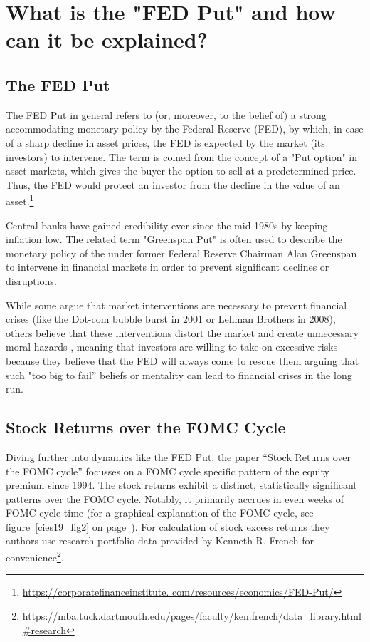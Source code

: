 \chapter{What is the "FED Put" and how can it be explained?}
\section{The FED Put}
The FED Put in general refers to (or, moreover, to the belief of) a strong accommodating monetary policy by the Federal Reserve (FED), by which, in case of a sharp decline in asset prices, the FED is expected by the market (its investors) to intervene. The term is coined from the concept of a "Put option" in asset markets, which gives the buyer the option to sell at a predetermined price. Thus, the FED would protect an investor from the decline in the value of an asset.\footnote{\url{https://corporatefinanceinstitute. com/resources/economics/FED-Put/}}

Central banks have gained credibility ever since the mid-1980s by keeping inflation low. \parencite{hall_is_2011} The related term "Greenspan Put" is often used to describe the monetary policy of the under former Federal Reserve Chairman Alan Greenspan to intervene in financial markets in order to prevent significant declines or disruptions. 

While some argue that market interventions are necessary to prevent financial crises (like the Dot-com bubble burst in 2001 or Lehman Brothers in 2008), others believe that these interventions distort the market and create unnecessary moral hazards \parencite{cieslak_economics_2021},  meaning that investors are willing to take on excessive risks because they believe that the FED will always come to rescue them arguing that such "too big to fail” beliefs or mentality can lead to financial crises in the long run.

\section{Stock Returns over the FOMC Cycle}

Diving further into dynamics like the FED Put,  the paper “Stock Returns over the FOMC cycle” focusses on a FOMC cycle specific pattern of the equity premium since 1994. 
The stock returns exhibit a distinct,  statistically significant patterns over the FOMC cycle.  Notably,  it primarily accrues in even weeks of FOMC cycle time (for a graphical explanation of the FOMC cycle, see figure~\ref{cies19_fig2} on page~\pageref{cies19_fig2}). For calculation of stock excess returns they authors use research portfolio data provided by Kenneth R. French for convenience\footnote{\url{https://mba.tuck.dartmouth.edu/pages/faculty/ken.french/data_library.html\#research}}.

